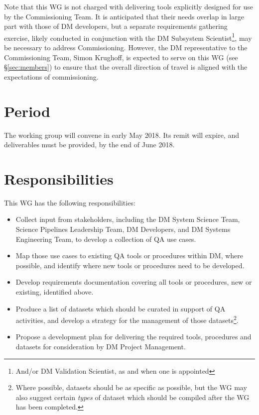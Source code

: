 \documentclass[DM,lsstdraft,toc]{lsstdoc}
\begin{document}
Note that this WG is not charged with delivering tools explicitly designed for
use by the Commissioning Team. It is anticipated that their needs overlap in
large part with those of DM developers, but a separate requirements gathering
exercise, likely conducted in conjunction with the DM Subsystem
Scientist\footnote{And/or DM Validation Scientist, as and when one is
appointed}, may be necessary to address Commissioning. However, the DM
representative to the Commissioning Team, Simon Krughoff, is expected to serve
on this WG (see \S\ref{sec:members}) to ensure that the overall direction of
travel is aligned with the expectations of commissioning.

\section{Period}
\label{sec:period}

The working group will convene in early May 2018. Its remit will expire, and
deliverables must be provided, by the end of June 2018.

\section{Responsibilities}

This WG has the following responsibilities:

\begin{itemize}

  \item{Collect input from stakeholders, including the DM System Science Team,
  Science Pipelines Leadership Team, DM Developers, and DM Systems Engineering
  Team, to develop a collection of QA use cases.}

  \item{Map those use cases to existing QA tools or procedures within DM,
  where possible, and identify where new tools or procedures need to be
  developed.}

  \item{Develop requirements documentation covering all tools or procedures,
  new or existing, identified above.}

  \item{Produce a list of datasets which should be curated in support of QA
  activities, and develop a strategy for the management of those
  datasets\footnote{Where possible, datasets should be as specific as
  possible, but the WG may also suggest certain \textit{types} of dataset
  which should be compiled after the WG has been completed.}.}

  \item{Propose a development plan for delivering the required tools,
  procedures and datasets for consideration by DM Project Management.}

\end{itemize}
\end{document}
